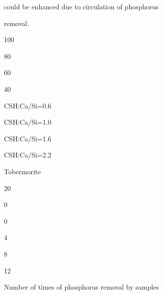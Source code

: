 \documentclass[a4paper,portrait,12pt]{article}
\begin{document}
\begin{flushleft}
could be enhanced due to circulation of phosphorus
\end{flushleft}


\begin{flushleft}
removal.
\end{flushleft}





100





80





60





40





\begin{flushleft}
CSH:Ca/Si=0.6
\end{flushleft}


\begin{flushleft}
CSH:Ca/Si=1.0
\end{flushleft}


\begin{flushleft}
CSH:Ca/Si=1.6
\end{flushleft}


\begin{flushleft}
CSH:Ca/Si=2.2
\end{flushleft}


\begin{flushleft}
Tobermorite
\end{flushleft}





20





0


0





4


8


12


\begin{flushleft}
Number of times of phosphorus removal by samples
\end{flushleft}
\end{document}
